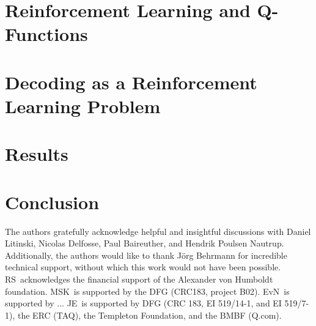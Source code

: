 \documentclass[onecolumn,preprintnumbers,amsmath,amssymb,notitlepage,nofootinbib,longbibliography,superscriptaddress,aps,pra,10pt]{revtex4-1}
\begin{document}
   






\section{Reinforcement Learning and Q-Functions}\label{s:reinforcement_learning}
\section{Decoding as a Reinforcement Learning Problem}\label{s:decoding_as_rl}
\section{Results}\label{s:results}
\section{Conclusion}\label{s:conclusions}


\begin{acknowledgments}
	The authors gratefully acknowledge helpful and insightful discussions with Daniel Litinski, Nicolas Delfosse, Paul Baireuther, and Hendrik Poulsen Nautrup.
	Additionally, the authors would like to thank J\"{o}rg Behrmann for incredible technical support, without which this work would not have been possible.
	RS\ acknowledges the financial support of the Alexander von Humboldt foundation.
	MSK\ is supported by the DFG (CRC183, project B02).
	EvN\ is supported by ...
	JE\ is supported by DFG (CRC 183, EI 519/14-1, and EI 519/7-1), the ERC (TAQ), the Templeton Foundation, and the BMBF (Q.com).
\end{acknowledgments}


\end{document}
